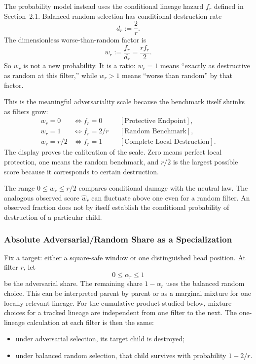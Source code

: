 The probability model instead uses the conditional lineage hazard $f_r$ defined in Section~2.1. Balanced random selection has conditional destruction rate
\begin{equation*}
d_r:=\frac2r.
\end{equation*}
The dimensionless worse-than-random factor is
\begin{equation*}
w_r
:=\frac{f_r}{d_r}
=\frac{rf_r}{2}.
\end{equation*}
So $w_r$ is not a new probability. It is a ratio: $w_r=1$ means ``exactly as destructive as random at this filter,'' while $w_r>1$ means ``worse than random'' by that factor.

This is the meaningful adversariality scale because the benchmark itself shrinks as filters grow:
\begin{equation*}
\begin{aligned}
w_r=0
&\Longleftrightarrow f_r=0
&&[\text{Protective Endpoint}],\\
w_r=1
&\Longleftrightarrow f_r=2/r
&&[\text{Random Benchmark}],\\
w_r=r/2
&\Longleftrightarrow f_r=1
&&[\text{Complete Local Destruction}].
\end{aligned}
\end{equation*}
The display proves the calibration of the scale. Zero means perfect local protection, one means the random benchmark, and $r/2$ is the largest possible score because it corresponds to certain destruction.

The range $0\le w_r\le r/2$ compares conditional damage with the neutral law. The analogous observed score $\widehat w_r$ can fluctuate above one even for a random filter. An observed fraction does not by itself establish the conditional probability of destruction of a particular child.
\subsubsection*{Absolute Adversarial/Random Share as a Specialization}
Fix a target: either a square-safe window or one distinguished head position. At filter $r$, let
\begin{equation*}
0\le \alpha_r\le 1
\end{equation*}
be the adversarial share. The remaining share $1-\alpha_r$ uses the balanced random choice.
This can be interpreted parent by parent or as a marginal mixture for one locally relevant lineage. For the cumulative product studied below, mixture choices for a tracked lineage are independent from one filter to the next. The one-lineage calculation at each filter is then the same:
\begin{itemize}
\item under adversarial selection, its target child is destroyed;
\item under balanced random selection, that child survives with probability $1-2/r$.
\end{itemize}

